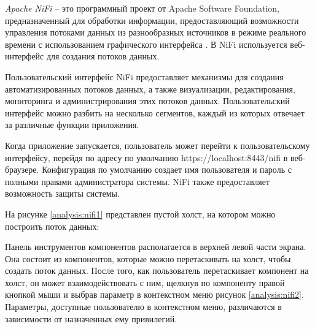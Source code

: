 \textit{Apache NiFi} -- это программный проект от Apache Software Foundation, предназначенный для обработки информации, 
предоставляющий возможности управления потоками 
данных из разнообразных источников в режиме реального времени с использованием графического интерфейса \cite{bib4}. 
В NiFi используется веб-интерфейс для создания потоков данных.

Пользовательский интерфейс NiFi предоставляет механизмы для
создания автоматизированных потоков данных, а также визуализации, редактирования, мониторинга и администрирования этих потоков данных.
Пользовательский интерфейс можно разбить на несколько сегментов, каждый из которых отвечает за различные функции приложения.

Когда приложение запускается, пользователь может перейти к пользовательскому интерфейсу, 
перейдя по адресу по умолчанию https://localhost:8443/nifi в веб-браузере. 
Конфигурация по умолчанию создает имя пользователя и пароль с полными правами администратора системы. 
NiFi также предоставляет возможность защиты системы.

На рисунке \ref{analysis:nifi1} представлен пустой холст, на котором можно построить поток данных:

\begin{figure}[ht!]
\end{figure}

Панель инструментов компонентов располагается в верхней левой части экрана. 
Она состоит из компонентов, которые можно перетаскивать на холст, чтобы создать поток данных. 
После того, как пользователь перетаскивает компонент на холст, он может взаимодействовать с ним, щелкнув 
по компоненту правой кнопкой мыши и выбрав параметр в контекстном меню рисунок \ref{analysis:nifi2}. 
Параметры, доступные пользователю в контекстном меню, различаются в зависимости от назначенных ему привилегий.

